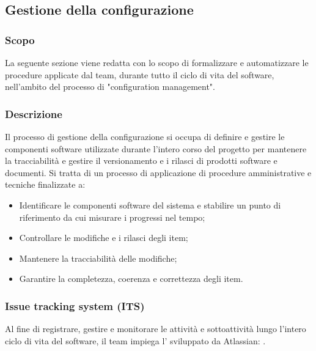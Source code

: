 \subsection{Gestione della configurazione}

\subsubsection{Scopo}
\par La seguente sezione viene redatta con lo scopo di formalizzare e automatizzare le procedure applicate dal team, durante tutto il ciclo di vita del software, nell'ambito del processo di "configuration management".

\subsubsection{Descrizione}
\par Il processo di gestione della configurazione si occupa di definire e gestire le componenti software utilizzate durante l'intero corso del progetto per mantenere la tracciabilità e gestire il versionamento e i rilasci di prodotti software e documenti. Si tratta di un processo di applicazione di procedure amministrative e tecniche finalizzate a:
\begin{itemize}
  \item Identificare le componenti software del sistema e stabilire un punto di riferimento da cui misurare i progressi nel tempo;
  \item Controllare le modifiche e i rilasci degli item;
  \item Mantenere la tracciabilità delle modifiche;
  \item Garantire la completezza, coerenza e correttezza degli item.
\end{itemize}

\subsubsection{Issue tracking system (ITS)}
\par Al fine di registrare, gestire e monitorare le attività e sottoattività lungo l'intero ciclo di vita del software, il team impiega l' sviluppato da Atlassian: .

